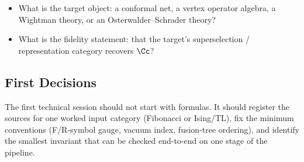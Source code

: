 \begin{itemize}
  \item What is the target object: a conformal net, a vertex operator algebra,
  a Wightman theory, or an Osterwalder--Schrader theory?
  \item What is the fidelity statement: that the target's superselection /
  representation category recovers $\Cc$?
\end{itemize}

\subsection{First Decisions}

The first technical session should not start with formulas. It should register
the sources for one worked input category (Fibonacci or Ising/$\mathrm{TL}$),
fix the minimum conventions (F/R-symbol gauge, vacuum index, fusion-tree
ordering), and identify the smallest invariant that can be checked end-to-end on
one stage of the pipeline.
